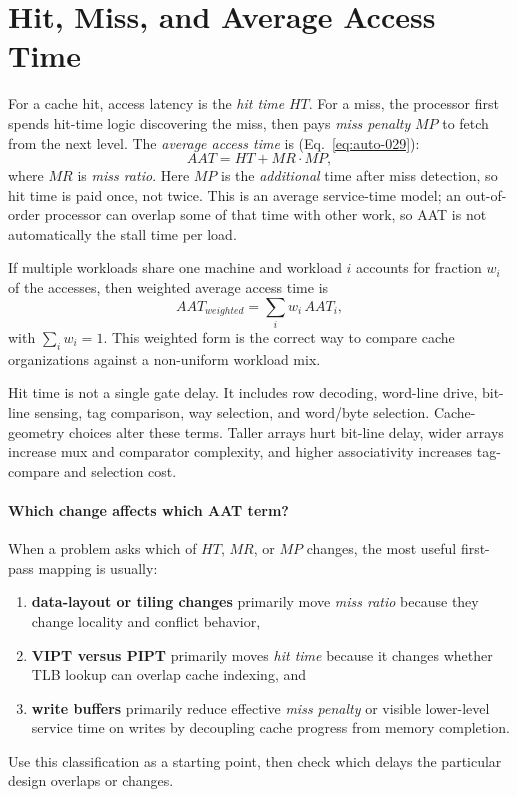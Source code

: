 \section{Hit, Miss, and Average Access Time}\label{sec:auto-024}
For a cache hit, access latency is the \textit{hit time} $HT$.
For a miss, the processor first spends hit-time logic discovering the miss, then pays \textit{miss penalty} $MP$ to fetch from the next level.
The \textit{average access time} is (Eq.~\eqref{eq:auto-029}):
\begin{equation}\label{eq:auto-029}
    AAT = HT + MR \cdot MP,
\end{equation}
where $MR$ is \textit{miss ratio}.
Here $MP$ is the \emph{additional} time after miss detection, so hit time is paid once, not twice.
This is an average service-time model; an out-of-order processor can overlap some of that time with other work, so AAT is not automatically the stall time per load.

If multiple workloads share one machine and workload $i$ accounts for fraction $w_i$ of the accesses, then weighted average access time is
\begin{equation}\label{eq:auto-029a}
    AAT_{weighted}=\sum_i w_i \, AAT_i,
\end{equation}
with $\sum_i w_i=1$.
This weighted form is the correct way to compare cache organizations against a non-uniform workload mix.

Hit time is not a single gate delay.
It includes row decoding, word-line drive, bit-line sensing, tag comparison, way selection, and word/byte selection.
Cache-geometry choices alter these terms.
Taller arrays hurt bit-line delay, wider arrays increase mux and comparator complexity, and higher associativity increases tag-compare and selection cost.

\paragraph{Which change affects which AAT term?}\label{par:auto-018a}
When a problem asks which of $HT$, $MR$, or $MP$ changes, the most useful first-pass mapping is usually:
\begin{enumerate}
    \item \textbf{data-layout or tiling changes} primarily move \textit{miss ratio} because they change locality and conflict behavior,
    \item \textbf{VIPT versus PIPT} primarily moves \textit{hit time} because it changes whether TLB lookup can overlap cache indexing, and
    \item \textbf{write buffers} primarily reduce effective \textit{miss penalty} or visible lower-level service time on writes by decoupling cache progress from memory completion.
\end{enumerate}
Use this classification as a starting point, then check which delays the particular design overlaps or changes.


